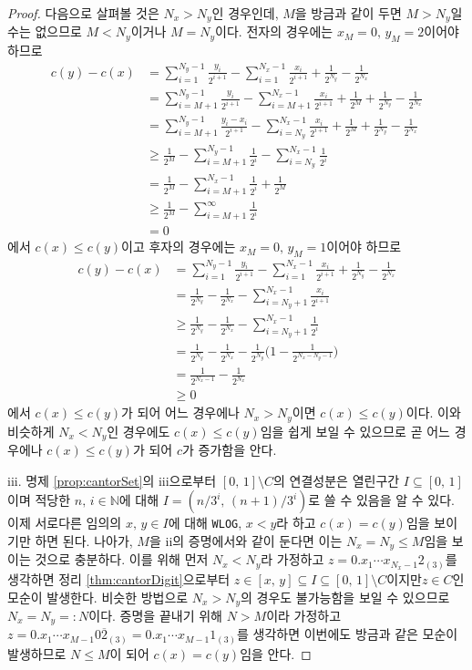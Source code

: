 \begin{proof}
    다음으로 살펴볼 것은 $N_x>N_y$인 경우인데, $M$을 방금과 같이 두면 $M>N_y$일 수는 없으므로 $M<N_y$이거나 $M=N_y$이다. 전자의 경우에는 $x_M=0,\,y_M=2$이어야 하므로
    \begin{align*}
        c(y)-c(x)&=\sum_{i=1}^{N_y-1}\frac{y_i}{2^{i+1}}-\sum_{i=1}^{N_x-1}\frac{x_i}{2^{i+1}}+\frac{1}{2^{N_y}}-\frac{1}{2^{N_x}}\\
        &=\sum_{i=M+1}^{N_y-1}\frac{y_i}{2^{i+1}}-\sum_{i=M+1}^{N_x-1}\frac{x_i}{2^{i+1}}+\frac{1}{2^M}+\frac{1}{2^{N_y}}-\frac{1}{2^{N_x}}\\
        &=\sum_{i=M+1}^{N_y-1}\frac{y_i-x_i}{2^{i+1}}-\sum_{i=N_y}^{N_x-1}\frac{x_i}{2^{i+1}}+\frac{1}{2^M}+\frac{1}{2^{N_y}}-\frac{1}{2^{N_x}}\\
        &\geq\frac{1}{2^M}-\sum_{i=M+1}^{N_y-1}\frac{1}{2^i}-\sum_{i=N_y}^{N_x-1}\frac{1}{2^i}\\
        &=\frac{1}{2^M}-\sum_{i=M+1}^{N_x-1}\frac{1}{2^i}+\frac{1}{2^M}\\
        &\geq\frac{1}{2^M}-\sum_{i=M+1}^\infty\frac{1}{2^i}\\
        &=0
    \end{align*}
    에서 $c(x)\leq c(y)$이고 후자의 경우에는 $x_M=0,\,y_M=1$이어야 하므로
    \begin{align*}
        c(y)-c(x)&=\sum_{i=1}^{N_y-1}\frac{y_i}{2^{i+1}}-\sum_{i=1}^{N_x-1}\frac{x_i}{2^{i+1}}+\frac{1}{2^{N_y}}-\frac{1}{2^{N_x}}\\
        &=\frac{1}{2^{N_y}}-\frac{1}{2^{N_x}}-\sum_{i=N_y+1}^{N_x-1}\frac{x_i}{2^{i+1}}\\
        &\geq\frac{1}{2^{N_y}}-\frac{1}{2^{N_x}}-\sum_{i=N_y+1}^{N_x-1}\frac{1}{2^i}\\
        &=\frac{1}{2^{N_y}}-\frac{1}{2^{N_x}}-\frac{1}{2^{N_y}}\bigg(1-\frac{1}{2^{N_x-N_y-1}}\bigg)\\
        &=\frac{1}{2^{N_x-1}}-\frac{1}{2^{N_x}}\\
        &\geq0
    \end{align*}
    에서 $c(x)\leq c(y)$가 되어 어느 경우에나 $N_x>N_y$이면 $c(x)\leq c(y)$이다. 이와 비슷하게 $N_x<N_y$인 경우에도 $c(x)\leq c(y)$임을 쉽게 보일 수 있으므로 곧 어느 경우에나 $c(x)\leq c(y)$가 되어 $c$가 증가함을 안다.

    iii. 명제 \ref{prop:cantorSet}의 iii으로부터 $[0,\,1]\setminus C$의 연결성분은 열린구간 $I\subseteq[0,\,1]$이며 적당한 $n,\,i\in\mathbb{N}$에 대해 $I=(n/3^i,\,(n+1)/3^i)$로 쓸 수 있음을 알 수 있다. 이제 서로다른 임의의 $x,\,y\in I$에 대해 \texttt{WLOG}, $x<y$라 하고 $c(x)=c(y)$임을 보이기만 하면 된다. 나아가, $M$을 ii의 증명에서와 같이 둔다면 이는 $N_x=N_y\leq M$임을 보이는 것으로 충분하다. 이를 위해 먼저 $N_x<N_y$라 가정하고 $z=0.x_1\cdots x_{N_x-1}2_{(3)}$를 생각하면 정리 \ref{thm:cantorDigit}으로부터 $z\in[x,\,y]\subseteq I\subseteq[0,\,1]\setminus C$이지만\footnotemark $z\in C$인 모순이 발생한다. 비슷한 방법으로 $N_x>N_y$의 경우도 불가능함을 보일 수 있으므로 $N_x=N_y=:N$이다. 증명을 끝내기 위해 $N>M$이라 가정하고 $z=0.x_1\cdots x_{M-1}0\overline{2}_{(3)}=0.x_1\cdots x_{M-1}1_{(3)}$를 생각하면 이번에도 방금과 같은 모순이 발생하므로 $N\leq M$이 되어 $c(x)=c(y)$임을 안다.


\end{proof}
